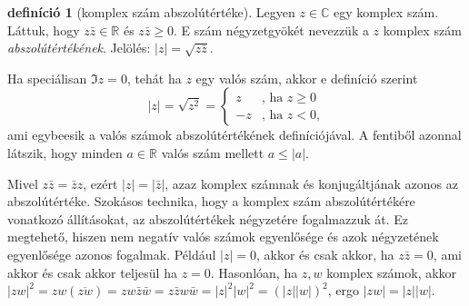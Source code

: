\documentclass[a4paper, showtrims]{memoir}
\theoremstyle{plain}
\theoremstyle{remark}
\theoremstyle{definition}
\newtheorem{definition}[proposition]{definíció}
\begin{document}
\begin{definition}[komplex szám abszolútértéke]
	Legyen $z\in\mathbb{C}$ egy komplex szám.
	Láttuk, hogy
	$z\bar{z}\in\mathbb{R}$ és
	$z\bar{z}\geq 0$.
	E szám négyzetgyökét nevezzük a $z$ komplex szám \emph{abszolútértékének}.
	Jelölés: $|z|=\sqrt{z\bar{z}}$.
\end{definition}
Ha speciálisan $\Im z=0$,
tehát ha $z$ egy valós szám,
akkor e definíció szerint
\[
	|z|=
	\sqrt{z^2}=
	\begin{cases}
		z  & \text{, ha }z\geq 0     \\
		-z & \text{, ha }z<0\text{,}
	\end{cases}
\]
ami egybeesik a valós számok abszolútértékének definíciójával.
A fentiből azonnal látszik, hogy minden $a\in\mathbb{R}$ valós szám mellett $a\leq|a|$.

Mivel $z\bar{z}=\bar{z}z$, ezért $|z|=|\bar{z}|$, azaz komplex számnak és konjugáltjának azonos az abszolútértéke.
Szokásos technika, hogy a komplex szám abszolútértékére vonatkozó állításokat, az abszolútértékek négyzetére fogalmazzuk át.
Ez megtehető, hiszen nem negatív valós számok egyenlősége és azok négyzetének egyenlősége azonos fogalmak.
Például $|z|=0$, akkor és csak akkor, ha $z\bar{z}=0$, ami akkor és csak akkor teljesül ha $z=0$.
Hasonlóan, ha $z,w$ komplex számok, akkor $|zw|^2=zw(\overline{zw})=zw\bar{z}\bar{w}=z\bar{z}w\bar{w}=|z|^2|w|^2=\left( |z||w| \right)^2$,
ergo $|zw|=|z||w|$.
\end{document}
